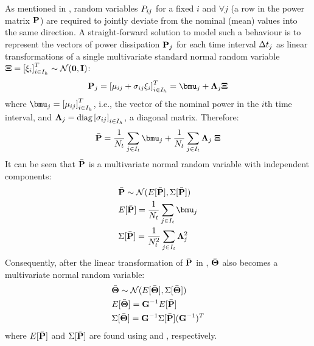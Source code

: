 As mentioned in , random variables $P_{ij}$ for a fixed $i$ and $\forall j$ (a row in the power matrix $\mathbf{P}$) are required to jointly deviate from the nominal (mean) values into the same direction. A straight-forward solution to model such a behaviour is to represent the vectors of power dissipation $\mathbf{P}_j$ for each time interval $\Delta t_j$ as linear transformations of a single multivariate standard normal random variable $\mathbf{\Xi} = \left[\xi_i\right]^T_{i \in I_h} \sim \mathcal{N}(\mathbf{0}, \mathbf{I})$:
\begin{equation} \equlabel{power-rv}
  \vpower_j = \vector{\mean{ij} + \deviation{ij} \stdnormal_i}_{i \in \nodeindex} = \vmean{j} + \ddeviation{j} \vstdnormal
\end{equation}
where $\vmean{j} = \vector{\mean{ij}}_{i \in \nodeindex}$, i.e., the vector of the nominal power in the $i$th time interval, and $\mathbf{\Lambda}_{j} = \text{diag}\left[\sigma_{ij}\right]_{i \in I_h}$, a diagonal matrix. Therefore:
\[
  \a{\vpower} = \frac{1}{\stepcount} \sum_{j \in \timeindex} \vmean{j} + \frac{1}{\stepcount} \sum_{j \in \timeindex} \ddeviation{j} \; \vstdnormal
\]
It can be seen that $\bar{\mathbf{P}}$ is a multivariate normal random variable with independent components:
\begin{align}
  & \a{\vpower} \sim \normal(\expectation{\a{\vpower}}, \covariance{\a{\vpower}}) \nonumber \\
  & \expectation{\a{\vpower}} = \frac{1}{\stepcount} \sum_{j \in \timeindex} \vmean{j} \equlabel{steady-power-mean} \\
  & \covariance{\a{\vpower}} = \frac{1}{\stepcount^2} \sum_{j \in \timeindex} \ddeviation{j}^2 \equlabel{steady-power-covariance}
\end{align}
Consequently, after the linear transformation of $\bar{\mathbf{P}}$ in , $\bar{\mathbf{\Theta}}$ also becomes a multivariate normal random variable:
\begin{align*}
  & \bar{\mathbf{\Theta}} \sim \mathcal{N}(E[\bar{\mathbf{\Theta}}], \Sigma[\bar{\mathbf{\Theta}}]) \\
  & E[\bar{\mathbf{\Theta}}] = \mathbf{G}^{-1} E[\bar{\mathbf{P}}] \\
  & \Sigma[\bar{\mathbf{\Theta}}] = \mathbf{G}^{-1} \Sigma[\bar{\mathbf{P}}] (\mathbf{G}^{-1})^T
\end{align*}
where $E[\bar{\mathbf{P}}]$ and $\Sigma[\bar{\mathbf{P}}]$ are found using  and , respectively.
